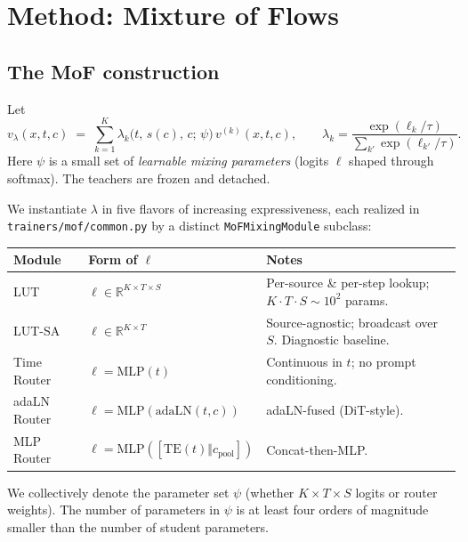 \documentclass[11pt,a4paper]{article}
\newcommand{\R}{\mathbb{R}}
\theoremstyle{definition}
\begin{document}
\section{Method: Mixture of Flows}
\label{sec:method}

\subsection{The MoF construction}
\label{ssec:mof_def}

Let
\begin{equation}
v_\lambda(x,t,c) \;=\; \sum_{k=1}^{K}
\lambda_k\!\big(t,\,s(c),\,c;\,\psi\big)\,v^{(k)}(x,t,c),
\qquad
\lambda_k = \frac{\exp(\ell_k/\tau)}{\sum_{k'}\exp(\ell_{k'}/\tau)}.
\label{eq:mof_def}
\end{equation}
Here $\psi$ is a small set of \emph{learnable mixing parameters} (logits
$\ell$ shaped through softmax). The teachers are frozen and detached.

We instantiate $\lambda$ in five flavors of increasing expressiveness, each
realized in \texttt{trainers/mof/common.py} by a distinct
\texttt{MoFMixingModule} subclass:

\begin{center}
\renewcommand{\arraystretch}{1.3}
\footnotesize
\begin{tabular}{@{}p{2.6cm}p{4.5cm}p{4.5cm}@{}}
\toprule
\textbf{Module} & \textbf{Form of $\ell$} & \textbf{Notes} \\
\midrule
LUT & $\ell\in\R^{K\times T\times S}$ & Per-source \& per-step lookup; $K{\cdot}T{\cdot}S\sim 10^2$ params. \\
LUT-SA & $\ell\in\R^{K\times T}$ & Source-agnostic; broadcast over $S$. Diagnostic baseline. \\
Time Router & $\ell = \mathrm{MLP}(t)$ & Continuous in $t$; no prompt conditioning. \\
adaLN Router & $\ell = \mathrm{MLP}(\mathrm{adaLN}(t,c))$ & adaLN-fused (DiT-style). \\
MLP Router & $\ell = \mathrm{MLP}([\mathrm{TE}(t)\Vert c_{\text{pool}}])$ & Concat-then-MLP. \\
\bottomrule
\end{tabular}
\end{center}

We collectively denote the parameter set $\psi$ (whether
$K\!\times\!T\!\times\!S$ logits or router weights). The number of
parameters in $\psi$ is at least four orders of magnitude smaller than the
number of student parameters.
\end{document}
